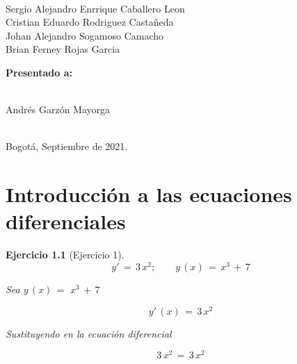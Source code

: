 \documentclass[a4paper,11pt]{book}
\newtheorem{ejer}{Ejercicio}[section]
\begin{document}
\begin{titlepage}
\begin{center}
\begin{large}
  

\  

  

Sergio Alejandro Enrrique Caballero Leon\\ 
Cristian Eduardo Rodriguez Castañeda \\ 
Johan Alejandro Sogamoso Camacho \\ 
Brian Ferney Rojas Garcia

\end{large} 

\vspace*{0.3in} 

  

\end{center} 

  

\begin{center} 

{\bf Presentado a:} \\ 

  

\  

  

Andrés Garzón Mayorga \\ 

  

\ 

  

Bogot{\'a}, Septiembre de 2021. 

\end{center} 

  

\end{titlepage} 

  

\tableofcontents 

  

\chapter{Introducción a las ecuaciones diferenciales} 

  

\begin{ejer}[Ejercicio 1] 


$$y'\,=\,3\,x^{2}; \qquad \boxed{y\,(x)\,=\,x^{3}\,+\,7}$$
 
 Sea $y\,(x)\,=\,\,x^{3}\,+\,7$
 
 $$y'\,(x)\,=\,3\,x^{2}$$
 
 
 Sustituyendo en la ecuación diferencial
 
 $$\boxed{{3\,x^{2}}\,=\,3\,x^{2}}$$
    
\end{ejer} 
\end{document}
